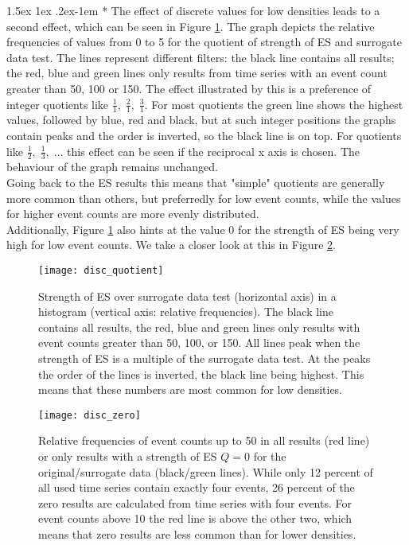 \documentclass[a4paper,12pt,twoside]{article}
\makeatletter
\renewcommand{\paragraph}{%
  \@startsection{paragraph}{4}%
  {\z@}{1.5ex \@plus 1ex \@minus .2ex}{-1em}%
  {\normalfont\normalsize\bfseries}%
}
\makeatother
\begin{document}
\paragraph*{} The effect of discrete values for low densities leads to a second effect, which can be seen in Figure \ref{img:disc_quotient}. The graph depicts the relative frequencies of values from 0 to 5 for the quotient of strength of ES and surrogate data test. The lines represent different filters: the black line contains all results; the red, blue and green lines only results from time series with an event count greater than 50, 100 or 150. The effect illustrated by this is a preference of integer quotients like $\frac{1}{1},\;\frac{2}{1},\;\frac{3}{1}$. For most quotients the green line shows the highest values, followed by blue, red and black, but at such integer positions the graphs contain peaks and the order is inverted, so the black line is on top. For quotients like $\frac{1}{2},\;\frac{1}{3},\;\dots$ this effect can be seen if the reciprocal x axis is chosen. The behaviour of the graph remains unchanged.\\
Going back to the ES results this means that "simple" quotients are generally more common than others, but preferredly for low event counts, while the values for higher event counts are more evenly distributed.\\
Additionally, Figure \ref{img:disc_quotient} also hints at the value 0 for the strength of ES being very high for low event counts. We take a closer look at this in Figure \ref{img:disc_zero}.\newpage
\begin{figure}[!htb]
\centering
\texttt{[image: disc\_quotient]}
\vspace{-0.7cm}
\caption{Strength of ES over surrogate data test (horizontal axis) in a histogram (vertical axis: relative frequencies). The black line contains all results, the red, blue and green lines only results with event counts greater than 50, 100, or 150. All lines peak when the strength of ES is a multiple of the surrogate data test. At the peaks the order of the lines is inverted, the black line being highest. This means that these numbers are most common for low densities.}
\label{img:disc_quotient}
\end{figure}
\vspace{-0.5cm}
\begin{figure}[!htb]
\centering
\texttt{[image: disc\_zero]}
\vspace{-0.7cm}
\caption{Relative frequencies of event counts up to 50 in all results (red line) or only results with a strength of ES $Q=0$ for the original/surrogate data (black/green lines). While only 12 percent of all used time series contain exactly four events, 26 percent of the zero results are calculated from time series with four events. For event counts above 10 the red line is above the other two, which means that zero results are less common than for lower densities.}
\label{img:disc_zero}
\vspace{-2cm}
\end{figure}\newpage
\end{document}
